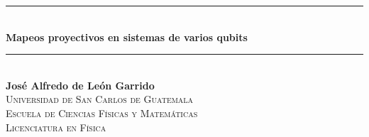 \documentclass[11pt,dvipsnames]{report}
\begin{document}
\begin{titlepage} %
\newcommand{\HRule}{\rule{\linewidth}{0.6mm}} %

\center %


\HRule\\[0.4cm]

{\LARGE\bfseries Mapeos proyectivos en sistemas de varios qubits}\\[0.4cm] 

\HRule\\[2cm]



\Large{\textbf{José Alfredo de León Garrido}}\\[2cm]


\textsc{\Large Universidad de San Carlos de Guatemala\\
		Escuela de Ciencias Físicas y Matemáticas\\
		Licenciatura en Física}\\[2cm]


\end{titlepage}
\end{document}
